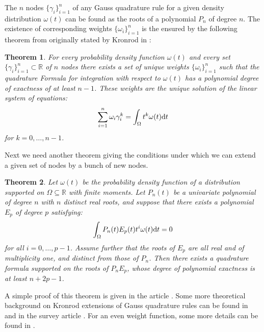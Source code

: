 \documentclass[a4paper,10pt]{article}
\newtheorem{theorem}{Theorem}
\begin{document}
The $n$ nodes $\{\gamma_i\}_{i=1}^{n}$ of any Gauss quadrature rule for a
given density distribution $\omega(t)$ can be found as the roots of a
polynomial $P_n$ of degree $n$. The existence of corresponding weights
$\{\omega_i\}_{i=1}^{n}$ is the ensured by the following theorem from
\cite{mehrotra-papp} originally stated by Kronrod in \cite{kronrod}:

\begin{theorem}
  \label{th:existence_weights}
  For every probability density function $\omega(t)$ and every set
  $\{\gamma_i\}_{i=1}^{n} \subset \mathbb{R}$ of $n$ nodes there exists
  a set of unique weights $\{\omega_i\}_{i=1}^{n}$ such that the quadrature
  Formula for integration with respect to $\omega(t)$ has a polynomial
  degree of exactness of at least $n-1$. These weights are the unique solution
  of the linear system of equations:
  \begin{equation}
    \label{eq:linsys_for_weights}
    \sum_{i=1}^n \omega_i \gamma_i^k = \int_{\Omega} t^k \omega(t) \mathrm{d}t
  \end{equation}
  for $k = 0, \ldots, n-1$.
\end{theorem}

Next we need another theorem giving the conditions under which we can
extend a given set of nodes by a bunch of new nodes.

\begin{theorem}
  \label{th:defining_extension}
  Let $\omega(t)$ be the probability density function of a distribution
  supported on $\Omega \subseteq \mathbb{R}$ with finite moments. Let $P_n(t)$
  be a univariate polynomial of degree $n$ with $n$ distinct real roots,
  and suppose that there exists a polynomial $E_p$ of degree $p$ satisfying:
  \begin{equation}
    \label{eq:defining_extension}
    \int_\Omega P_n(t) E_p(t) t^i \omega(t) \mathrm{d}t = 0
  \end{equation}
  for all $i = 0, \ldots, p-1$. Assume further that the roots of $E_p$
  are all real and of multiplicity one, and distinct from
  those of $P_n$. Then there exists a quadrature formula supported on the
  roots of $P_n E_p$, whose degree of polynomial exactness is at least
  $n + 2p -1$.
\end{theorem}

A simple proof of this theorem is given in the article \cite{mehrotra-papp}.
Some more theoretical background on Kronrod extensions of Gauss quadrature rules
can be found in \cite{gautschi-rivlin, monegato1978_3} and in the survey article
\cite{monegato1982}. For an even weight function, some more details can be found
in \cite{brezinski}.
\end{document}
